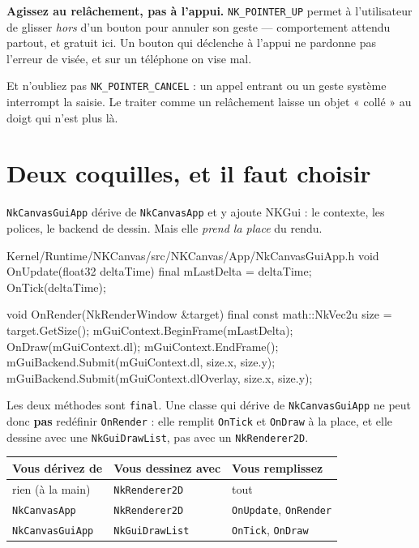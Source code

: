 \begin{nkpiege}
\textbf{Agissez au relâchement, pas à l'appui.} \texttt{NK\_POINTER\_UP} permet à
l'utilisateur de glisser \emph{hors} d'un bouton pour annuler son geste ---
comportement attendu partout, et gratuit ici. Un bouton qui déclenche à l'appui
ne pardonne pas l'erreur de visée, et sur un téléphone on vise mal.

Et n'oubliez pas \texttt{NK\_POINTER\_CANCEL} : un appel entrant ou un geste
système interrompt la saisie. Le traiter comme un relâchement laisse un objet
« collé » au doigt qui n'est plus là.
\end{nkpiege}

\section{Deux coquilles, et il faut choisir}

\texttt{NkCanvasGuiApp} dérive de \texttt{NkCanvasApp} et y ajoute NKGui : le
contexte, les polices, le backend de dessin. Mais elle \emph{prend la place} du
rendu.

\begin{nkcode}{Kernel/Runtime/NKCanvas/src/NKCanvas/App/NkCanvasGuiApp.h}
void OnUpdate(float32 deltaTime) final {
    mLastDelta = deltaTime;
    OnTick(deltaTime);
}

void OnRender(NkRenderWindow &target) final {
    const math::NkVec2u size = target.GetSize();
    mGuiContext.BeginFrame(mLastDelta);
    OnDraw(mGuiContext.dl);
    mGuiContext.EndFrame();
    mGuiBackend.Submit(mGuiContext.dl, size.x, size.y);
    mGuiBackend.Submit(mGuiContext.dlOverlay, size.x, size.y);
}
\end{nkcode}

Les deux méthodes sont \texttt{final}. Une classe qui dérive de
\texttt{NkCanvasGuiApp} ne peut donc \textbf{pas} redéfinir \texttt{OnRender} :
elle remplit \texttt{OnTick} et \texttt{OnDraw} à la place, et elle dessine avec
une \texttt{NkGuiDrawList}, pas avec un \texttt{NkRenderer2D}.

\begin{center}
\begin{tabular}{@{}lll@{}}
\toprule
\textbf{Vous dérivez de} & \textbf{Vous dessinez avec} & \textbf{Vous remplissez} \\
\midrule
rien (à la main)        & \texttt{NkRenderer2D}   & tout \\
\texttt{NkCanvasApp}    & \texttt{NkRenderer2D}   & \texttt{OnUpdate}, \texttt{OnRender} \\
\texttt{NkCanvasGuiApp} & \texttt{NkGuiDrawList}  & \texttt{OnTick}, \texttt{OnDraw} \\
\bottomrule
\end{tabular}
\end{center}

